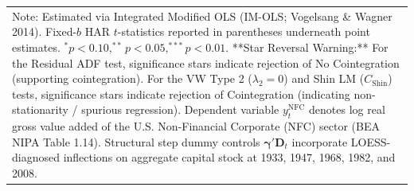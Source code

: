 \begin{landscape}
\begin{table}[H]
\begin{tabular}{p{4.8cm}p{1.3cm}p{1.3cm}p{1.3cm}p{1.3cm}p{1.3cm}p{1.3cm}p{1.3cm}p{1.3cm}p{1.3cm}}
\multicolumn{10}{p{19.5cm}}{\footnotesize Note: Estimated via Integrated Modified OLS (IM-OLS; Vogelsang \& Wagner 2014). Fixed-$b$ HAR $t$-statistics reported in parentheses underneath point estimates. $^*p<0.10, ^{**}p<0.05, ^{***}p<0.01$. **Star Reversal Warning:** For the Residual ADF test, significance stars indicate rejection of No Cointegration (supporting cointegration). For the VW Type 2 ($\lambda_2 = 0$) and Shin LM ($C_{\text{Shin}}$) tests, significance stars indicate rejection of Cointegration (indicating non-stationarity / spurious regression). Dependent variable $y_t^{\text{NFC}}$ denotes log real gross value added of the U.S. Non-Financial Corporate (NFC) sector (BEA NIPA Table 1.14). Structural step dummy controls $\boldsymbol{\gamma}' \mathbf{D}_t$ incorporate LOESS-diagnosed inflections on aggregate capital stock at 1933, 1947, 1968, 1982, and 2008.}
\end{tabular}
\end{table}
\end{landscape}
